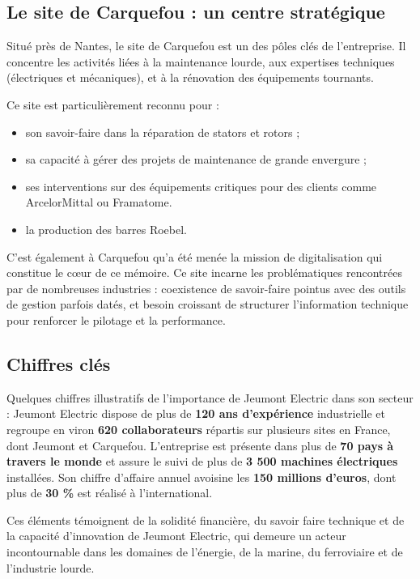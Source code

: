 \documentclass[11pt,a4paper]{article}
\begin{document}
\subsection{Le site de Carquefou : un centre stratégique}

Situé près de Nantes, le site de Carquefou est un des pôles clés de l’entreprise. Il concentre les activités liées à la maintenance lourde, aux expertises techniques (électriques et mécaniques), et à la rénovation des équipements tournants.

Ce site est particulièrement reconnu pour :
\begin{itemize}
    \item son savoir-faire dans la réparation de stators et rotors ;
    \item sa capacité à gérer des projets de maintenance de grande envergure ;
    \item ses interventions sur des équipements critiques pour des clients comme ArcelorMittal ou Framatome.
    \item la production des barres Roebel.
\end{itemize}

C’est également à Carquefou qu’a été menée la mission de digitalisation qui constitue le cœur de ce mémoire. Ce site incarne les problématiques rencontrées par de nombreuses industries : coexistence de savoir-faire pointus avec des outils de gestion parfois datés, et besoin croissant de structurer l’information technique pour renforcer le pilotage et la performance.

\subsection{Chiffres clés}
Quelques chiffres illustratifs de l'importance de Jeumont Electric dans son secteur :
Jeumont Electric dispose de plus de \textbf{120 ans d'expérience} industrielle et regroupe en viron \textbf{620 collaborateurs} répartis sur plusieurs sites en France, dont Jeumont et Carquefou.
L'entreprise est présente dans plus de \textbf{70 pays à travers le monde} et assure le suivi de plus de \textbf{3 500 machines électriques} installées. Son chiffre d'affaire annuel avoisine les \textbf{150 millions d'euros}, dont plus de \textbf{30 \% }est réalisé à l'international.

Ces éléments témoignent de la solidité financière, du savoir faire technique et de la capacité d'innovation de Jeumont Electric, qui demeure un acteur incontournable dans les domaines de l'énergie, de la marine, du ferroviaire et de l'industrie lourde.
\end{document}
